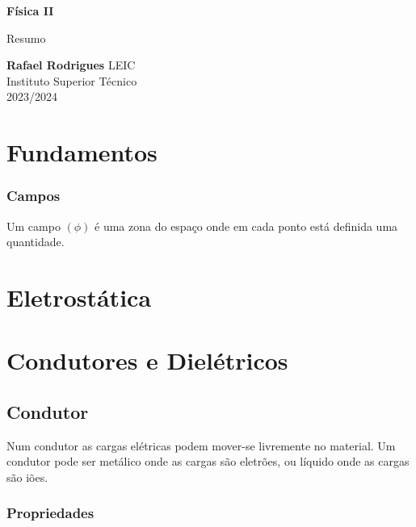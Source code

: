 \documentclass[11pt]{article}
\begin{document}
\begin{titlepage}
    \begin{center}
        \vspace*{1cm}

        \textbf{\LARGE Física II}
        \vspace{0.5cm}

        \Large Resumo
        \vspace{1.5cm}

        \textbf{Rafael Rodrigues}
        \vfill
        LEIC \\
        Instituto Superior Técnico \\
        2023/2024
    \end{center}
\end{titlepage}

\tableofcontents

\newpage

\section{Fundamentos}

\subsubsection*{Campos}

Um campo $(\phi)$ é uma zona do espaço onde em cada ponto está definida uma quantidade. 

\section{Eletrostática}

\section{Condutores e Dielétricos}

\subsection{Condutor}

Num condutor as cargas elétricas podem mover-se livremente no material. Um condutor pode ser metálico onde as cargas são eletrões, ou líquido onde as cargas são iões.

\subsubsection{Propriedades}
\end{document}
